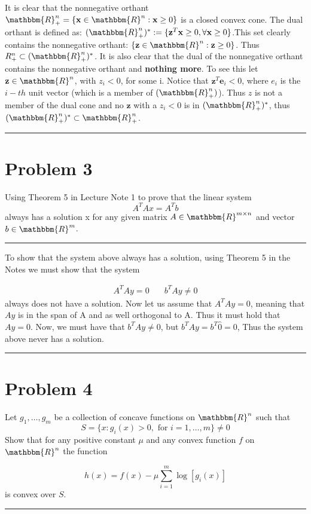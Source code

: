 \documentclass{article} %
\newcommand{\R}{\mathbbm{R}}
\newcommand{\h}[1]{\expandafter\hat#1}
\newcommand{\B}[1]{\mathbf#1}
\begin{document}
It is clear that the nonnegative orthant $\R_{+}^{n} = \{ \B{x} \in \R^{n}: \B{x} \geq 0\}$ is a closed convex cone. The dual 
orthant is defined as: $(\R_{+}^{n})^{*} := \{ \B{z}^T \B{x} \geq 0, \forall \B{x} \geq 0 \}$.This set clearly
contains the nonnegative orthant: $\{\B{z} \in \R^{n}: \B{z} \geq 0\}$. Thus $ R_{+}^{n} \subset (\R_{+}^{n})^{*}$. It is also clear that
the dual of the nonnegative orthant contains the nonnegative orthant and \textbf{nothing more}. To see this let $\B{z} \in \R^n$, with
$z_i < 0$, for some i. Notice that $\B{z}^T \B{e_i} < 0$, where $e_i$ is the $i-th$ unit vector (which is a member of $(\R_{+}^n)$). Thus $z$ is not
a member of the dual cone and no $\B{z}$ with a $z_i < 0$ is in $(\R_{+}^{n})^{*}$, thus $(\R_{+}^{n})^{*} \subset \R_{+}^{n}$.
\rule{\textwidth}{1pt}
\section*{Problem 3}
Using Theorem 5 in Lecture Note 1 to prove that the linear system 
\[
A^T Ax = A^T b
\]
always has a solution x for any given matrix $A \in \R^{m \times n}$ and vector $b \in \R^m$. 
\rule{\textwidth}{1pt}

To show that the system above always has a solution, using Theorem 5 in the Notes we must show that the system 

\begin{equation*}
\begin{aligned}
A^{T}A y = 0 & \quad  b^{T}A y \neq 0
\end{aligned}
\end{equation*}
always does not have a solution. Now let us assume that $A^TAy = 0$, meaning that $Ay$ is in the span of A and as well orthogonal to A. Thus it must hold that
$Ay = 0$. Now, we must have that $b^T A y \neq 0$, but $ b^T A y = b^T \h{0}  = 0$, Thus the system above never has a solution. 

\rule{\textwidth}{1pt}
\section*{Problem 4}
Let $g_1, \hdots, g_m$ be a collection of concave functions on $\R^n$ such that 
\[
S = \{x: g_i(x) > 0, \mbox{ for } i=1, \hdots, m \} \neq 0
\]
Show that for any positive constant $\mu$ and any convex function $f$ on $\R^n$ the function 

\[
h(x) = f(x) - \mu \sum_{i=1}^{m} \log[g_i(x)]
\]
is convex over $S$. 

\rule{\textwidth}{1pt}
\end{document}
